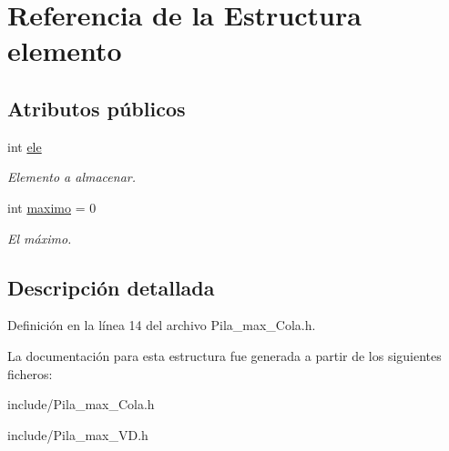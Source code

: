 \hypertarget{structelemento}{}\section{Referencia de la Estructura elemento}
\label{structelemento}
\subsection*{Atributos públicos}
\begin{DoxyCompactItemize}
\item 
\mbox{\label{structelemento_a954579dc7ed0033eefa875742ece867b}} 
int \hyperlink{structelemento_a954579dc7ed0033eefa875742ece867b}{ele}
\begin{DoxyCompactList}\small\item\em Elemento a almacenar. \end{DoxyCompactList}\item 
\mbox{\label{structelemento_aefc00344a4cf9303417ccab8158bb803}} 
int \hyperlink{structelemento_aefc00344a4cf9303417ccab8158bb803}{maximo} = 0
\begin{DoxyCompactList}\small\item\em El máximo. \end{DoxyCompactList}\end{DoxyCompactItemize}


\subsection{Descripción detallada}


Definición en la línea 14 del archivo Pila\+\_\+max\+\_\+\+Cola.\+h.



La documentación para esta estructura fue generada a partir de los siguientes ficheros\+:\begin{DoxyCompactItemize}
\item 
include/Pila\+\_\+max\+\_\+\+Cola.\+h\item 
include/Pila\+\_\+max\+\_\+\+V\+D.\+h\end{DoxyCompactItemize}
